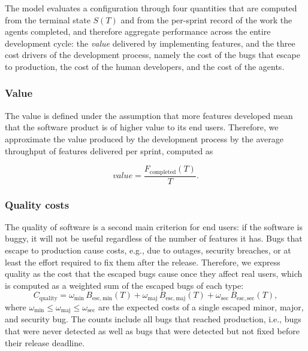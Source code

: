 \documentclass[smallextended]{svjour3}       %
\begin{document}
The model evaluates a configuration through four quantities that are computed from the terminal state $S(T)$ and from the per-sprint record of the work the agents completed, and therefore aggregate performance across the entire development cycle: the \emph{value} delivered by implementing features, and the three cost drivers of the development process, namely the cost of the bugs that escape to production, the cost of the human developers, and the cost of the agents. 

\subsubsection{Value}

The value is defined under the assumption that more features developed mean that the software product is of higher value to its end users. Therefore, we approximate the value produced by the development process by the average throughput of features delivered per sprint, computed as

\begin{equation}
  \mathit{value} = \frac{F_\mathrm{completed}(T)}{T}.
  \label{eq:obj_V}
\end{equation}


\subsubsection{Quality costs}

The quality of software is a second main criterion for end users: if the software is buggy, it will not be useful regardless of the number of features it has. Bugs that escape to production cause costs, e.g., due to outages, security breaches, or at least the effort required to fix them after the release. Therefore, we express quality as the cost that the escaped bugs cause once they affect real users, which is computed as a weighted sum of the escaped bugs of each type:
\begin{equation}
  C_\mathrm{quality} = \omega_\mathrm{min}\,B_\mathrm{esc,min}(T)
          + \omega_\mathrm{maj}\,B_\mathrm{esc,maj}(T)
          + \omega_\mathrm{sec}\,B_\mathrm{esc,sec}(T),
  \label{eq:obj_Q}
\end{equation}
where $\omega_\mathrm{min} \leq \omega_\mathrm{maj} \leq \omega_\mathrm{sec}$
are the expected costs of a single escaped minor, major, and security bug. The counts include all bugs that reached production, i.e., bugs that were never detected as well as bugs that were detected but not fixed
before their release deadline.
\end{document}
